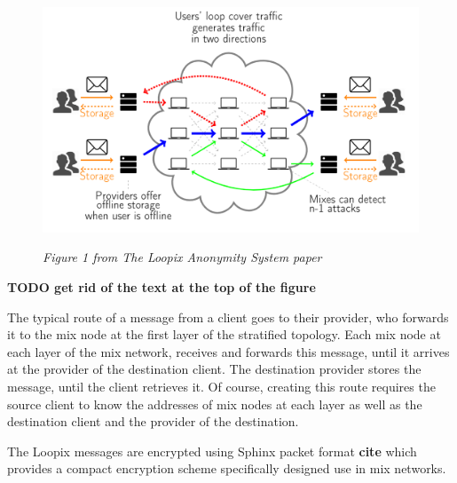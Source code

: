 \documentclass[a4paper,11pt,oneside]{report}
\begin{document}
\begin{figure}[H]
    \centering
    \includegraphics[width=0.8\linewidth]{plots/loopix.png}
    \caption{}
    \label{fig:loopix}
    \small\textit{Figure 1 from The Loopix Anonymity System paper}
\end{figure}

\textbf{TODO get rid of the text at the top of the figure}

The typical route of a message from a client goes to their provider, who forwards it to the mix node at the first layer of the stratified topology. Each mix node at each layer of the mix network, receives and forwards this message, until it arrives at the provider of the destination client. The destination provider stores the message, until the client retrieves it. Of course, creating this route requires the source client to know the addresses of mix nodes at each layer as well as the destination client and the provider of the destination.

The Loopix messages are encrypted using Sphinx packet format \textbf{cite} which provides a compact encryption scheme specifically designed use in mix networks.
\end{document}
